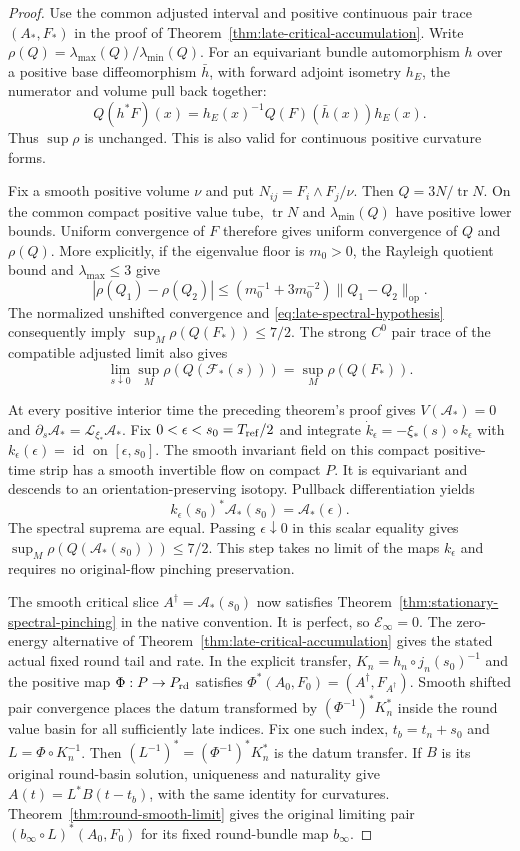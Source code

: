 \documentclass[11pt]{article}
\numberwithin{equation}{section}
\theoremstyle{definition}
\theoremstyle{remark}
\newcommand{\id}{\operatorname{id}}
\begin{document}
\begin{proof}
Use the common adjusted interval and positive continuous
pair trace $(A_*,F_*)$ in the proof of
Theorem~\ref{thm:late-critical-accumulation}. Write
$\rho(Q)=\lambda_{\max}(Q)/\lambda_{\min}(Q)$.
For an equivariant bundle automorphism $h$ over a positive
base diffeomorphism $\bar h$, with forward adjoint isometry
$h_E$, the numerator and volume pull back together:
\[
 Q(h^*F)(x)=h_E(x)^{-1}Q(F)(\bar h(x))h_E(x).
\]
Thus $\sup\rho$ is unchanged. This is also valid for continuous
positive curvature forms.

Fix a smooth positive volume $\nu$ and put
$N_{ij}=F_i\wedge F_j/\nu$. Then $Q=3N/\operatorname{tr}N$.
On the common compact positive value tube,
$\operatorname{tr}N$ and $\lambda_{\min}(Q)$ have positive
lower bounds. Uniform convergence of $F$ therefore gives
uniform convergence of $Q$ and $\rho(Q)$. More explicitly,
if the eigenvalue floor is $m_0>0$, the Rayleigh quotient
bound and $\lambda_{\max}\le3$ give
\[
 |\rho(Q_1)-\rho(Q_2)|
 \le(m_0^{-1}+3m_0^{-2})\|Q_1-Q_2\|_{\mathrm{op}}.
\]
The normalized unshifted convergence and
\eqref{eq:late-spectral-hypothesis} consequently imply
$\sup_M\rho(Q(F_*))\le7/2$.
The strong $C^0$ pair trace of the compatible adjusted
limit also gives
\[
 \lim_{s\downarrow0}\sup_M\rho(Q(\mathcal F_*(s)))
                         =\sup_M\rho(Q(F_*)).
\]

At every positive interior time the preceding theorem's
proof gives $V(\mathcal A_*)=0$ and
$\partial_s\mathcal A_*=\mathcal L_{\xi_*}\mathcal A_*$.
Fix $0<\epsilon<s_0=T_{\rm ref}/2$ and integrate
$\dot k_\epsilon=-\xi_*(s)\circ k_\epsilon$ with
$k_\epsilon(\epsilon)=\id$ on $[\epsilon,s_0]$.
The smooth invariant field on this compact positive-time
strip has a smooth invertible flow on compact $P$.
It is equivariant and descends to an orientation-preserving
isotopy. Pullback differentiation yields
\[
 k_\epsilon(s_0)^*\mathcal A_*(s_0)=\mathcal A_*(\epsilon).
\]
The spectral suprema are equal. Passing $\epsilon\downarrow0$
in this scalar equality gives
$\sup_M\rho(Q(\mathcal A_*(s_0)))\le7/2$.
This step takes no limit of the maps $k_\epsilon$ and
requires no original-flow pinching preservation.

The smooth critical slice $A^\dagger=\mathcal A_*(s_0)$
now satisfies Theorem~\ref{thm:stationary-spectral-pinching}
in the native convention. It is perfect, so
$\mathscr E_\infty=0$. The zero-energy alternative of
Theorem~\ref{thm:late-critical-accumulation} gives the stated
actual fixed round tail and rate. In the explicit transfer,
$K_n=h_n\circ j_n(s_0)^{-1}$ and the positive map
$\Phi:P\to P_{\rm rd}$ satisfies
$\Phi^*(A_0,F_0)=(A^\dagger,F_{A^\dagger})$.
Smooth shifted pair convergence places the datum transformed
by $(\Phi^{-1})^*K_n^*$ inside the round value basin for
all sufficiently late indices. Fix one such index,
$t_b=t_n+s_0$ and $L=\Phi\circ K_n^{-1}$. Then
$(L^{-1})^*=(\Phi^{-1})^*K_n^*$ is the datum transfer.
If $B$ is its original round-basin solution, uniqueness and
naturality give $A(t)=L^*B(t-t_b)$, with the same identity
for curvatures. Theorem~\ref{thm:round-smooth-limit} gives
the original limiting pair $(b_\infty\circ L)^*(A_0,F_0)$
for its fixed round-bundle map $b_\infty$.
\end{proof}
\end{document}
